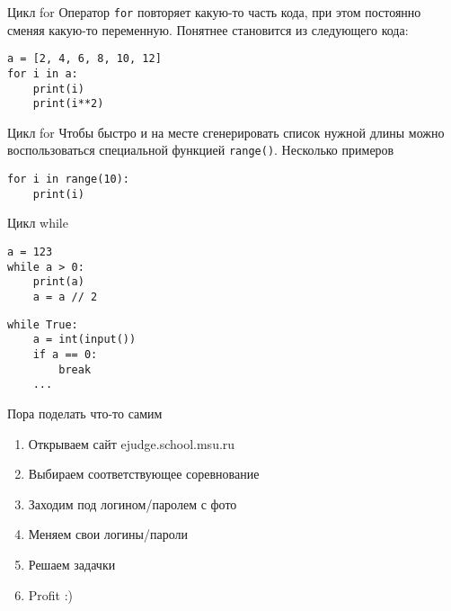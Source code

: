 \documentclass[hyperref=unicode, aspectratio=169]{beamer}
\begin{document}
\begin{frame}[fragile]{Цикл for}
    Оператор \texttt{for} повторяет какую-то часть кода, при этом постоянно сменяя какую-то переменную. Понятнее становится из следующего кода: 
    \begin{example}
        \begin{verbatim}
a = [2, 4, 6, 8, 10, 12]
for i in a:
    print(i)
    print(i**2)
        \end{verbatim}
    \end{example}
\end{frame}

\begin{frame}[fragile]{Цикл for}
    Чтобы быстро и на месте сгенерировать список нужной длины можно воспользоваться специальной функцией \texttt{range()}. Несколько примеров 
    \begin{example}
        \begin{verbatim}
for i in range(10):
    print(i)
        \end{verbatim}
    \end{example}
\end{frame}

\begin{frame}[fragile]{Цикл while}
    \begin{example}
        \begin{verbatim}
a = 123
while a > 0:
    print(a)
    a = a // 2
        \end{verbatim}
    \end{example}
    \begin{example}
        \begin{verbatim}
while True:
    a = int(input())
    if a == 0:
        break
    ...
        \end{verbatim}
    \end{example}
\end{frame}

\begin{frame}[fragile]{Пора поделать что-то самим}
    \begin{enumerate}
        \item Открываем сайт ejudge.school.msu.ru
        \item Выбираем соответствующее соревнование
        \item Заходим под логином/паролем с фото
        \item Меняем свои логины/пароли
        \item Решаем задачки
        \item Profit :)
    \end{enumerate}
\end{frame}
\end{document}
